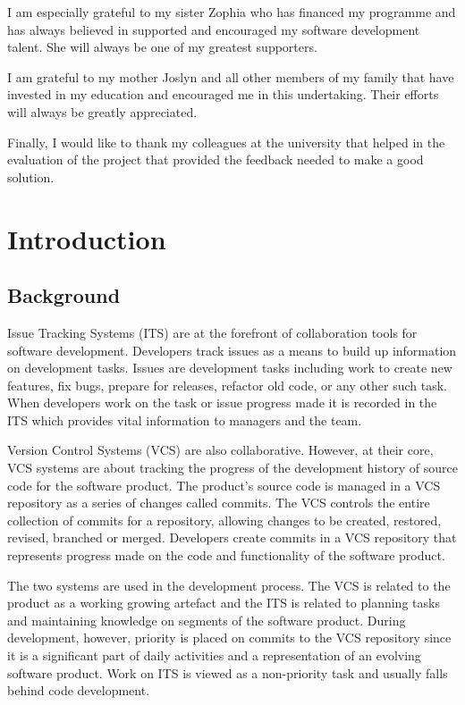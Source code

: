 \documentclass{mproj}
\begin{document}
I am especially grateful to my sister Zophia who has financed my programme and has always believed in supported and encouraged my software development talent. She will always be one of my greatest supporters.

I am grateful to my mother Joslyn and all other members of my family that have invested in my education and encouraged me in this undertaking. Their efforts will always be greatly appreciated.

Finally, I would like to thank my colleagues at the university that helped in the evaluation of the project that provided the feedback needed to make a good solution.

\tableofcontents



\chapter{Introduction}\label{intro}

\section{Background}

Issue Tracking Systems (ITS) are at the forefront of collaboration tools for software development. Developers track issues as a means to build up information on development tasks. Issues are development tasks including work to create new features, fix bugs, prepare for releases, refactor old code, or any other such task. When developers work on the task or issue progress made it is recorded in the ITS which provides vital information to managers and the team.

Version Control Systems (VCS) are also collaborative. However, at their core, VCS systems are about tracking the progress of the development history of source code for the software product. The product’s source code is managed in a VCS repository as a series of changes called commits. The VCS controls the entire collection of commits for a repository, allowing changes to be created, restored, revised, branched or merged. Developers create commits in a VCS repository that represents progress made on the code and functionality of the software product.

The two systems are used in the development process. The VCS is related to the product as a working growing artefact and the ITS is related to planning tasks and maintaining knowledge on segments of the software product. During development, however, priority is placed on commits to the VCS repository since it is a significant part of daily activities and a representation of an evolving software product. Work on ITS is viewed as a non-priority task and usually falls behind code development.
\end{document}
